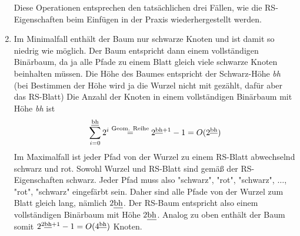 \documentclass[11pt,a4paper]{article}
\begin{document}
\begin{loesung}
\begin{enumerate}[label=\alph*)]
\begin{enumerate}[label=\roman*)]
\begin{figure}[h!]
\begin{subfigure}[t]{0.15\textwidth}
                \end{subfigure}
            \end{figure}
        \end{enumerate}
        Diese Operationen entsprechen den tatsächlichen drei Fällen, wie die RS-Eigenschaften beim Einfügen in der Praxis wiederhergestellt werden.
        
        \item
        Im Minimalfall enthält der Baum nur schwarze Knoten und ist damit so niedrig wie möglich.
        Der Baum entspricht dann einem vollständigen Binärbaum, da ja alle Pfade zu einem Blatt gleich viele schwarze Knoten beinhalten müssen.
        Die Höhe des Baumes entspricht der Schwarz-Höhe \emph{bh} (bei Bestimmen der Höhe wird ja die Wurzel nicht mit gezählt, dafür aber das RS-Blatt)
        Die Anzahl der Knoten in einem vollständigen Binärbaum mit Höhe \emph{bh} ist
        \begin{equation*}
            \sum\limits_{i = 0}^{\text{\emph{bh}}} 2^i \overset{\text{Geom. Reihe}}{=}
            2^{\text{\emph{bh}} + 1} - 1 = O(2^\text{\emph{bh}})
        \end{equation*}
        Im Maximalfall ist jeder Pfad von der Wurzel zu einem RS-Blatt abwechselnd schwarz und rot.
        Sowohl Wurzel und RS-Blatt sind gemäß der RS-Eigenschaften schwarz.
        Jeder Pfad muss also "schwarz", "rot", "schwarz", $\ldots$, "rot", "schwarz" eingefärbt sein.
        Daher sind alle Pfade von der Wurzel zum Blatt gleich lang, nämlich $2\text{\emph{bh}}$.
        Der RS-Baum entspricht also einem vollständigen Binärbaum mit Höhe $2\text{\emph{bh}}$.
        Analog zu oben enthält der Baum somit $2^{2\text{\emph{bh}} + 1} - 1 = O(4^\text{\emph{bh}})$ Knoten.


\end{enumerate}
\end{loesung}
\end{document}
